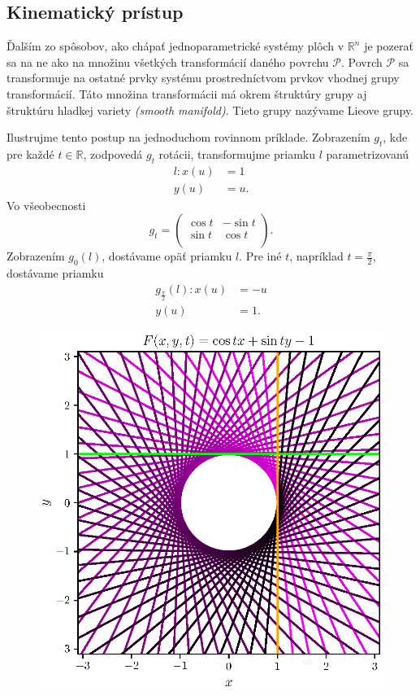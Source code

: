 \subsection{Kinematický prístup}
Ďalším zo spôsobov, ako chápať jednoparametrické systémy plôch v $\mathbb{R}^n$ je pozerať sa na ne ako na množinu všetkých transformácií daného povrchu $\mathcal{P}$. Povrch $\mathcal{P}$ sa transformuje na ostatné prvky systému prostredníctvom prvkov vhodnej grupy transformácií. Táto množina transformácii má okrem štruktúry grupy aj štruktúru hladkej variety \textit{(smooth manifold)}. Tieto grupy nazývame Lieove grupy.

\begin{example}
Ilustrujme tento postup na jednoduchom rovinnom príklade. Zobrazením $g_t$, kde pre každé $t \in \mathbb{R}$, zodpovedá $g_t$ rotácii, transformujme priamku $l$  parametrizovanú
\begin{align*}
l \colon x(u) &= 1 \\
y(u) &= u. 
\end{align*}
Vo všeobecnosti 
$$
g_t = \begin{pmatrix}
\cos t & -\sin t  \\
\sin t & \cos t  \\
\end{pmatrix}.
$$
Zobrazením $g_{0}(l)$, dostávame opäť priamku $l$. Pre iné $t$, napríklad $t = \frac{\pi}{2}$, dostávame priamku 
\begin{align*}
g_{\frac{\pi}{2}}(l) \colon x(u) &= -u \\
y(u) &= 1.
\end{align*}
\begin{figure}[h]
	\centering
	\includegraphics{images/lines_in_normal_form.eps}

\end{figure}
\end{example}
